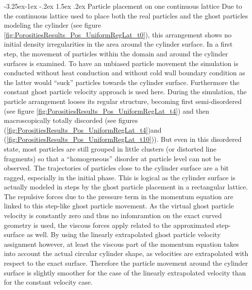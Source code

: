 \documentclass{report}
\makeatletter
\renewcommand\paragraph{\@startsection{paragraph}{4}{\z@}%
  {-3.25ex\@plus -1ex \@minus -.2ex}%
  {1.5ex \@plus .2ex}%
  {\normalfont\normalsize\bfseries}}
\makeatother
\begin{document}
\paragraph{Particle placement on one continuous lattice}
Due to the continuous lattice used to place both the real particles and the ghost particles modeling the cylinder (see figure \ref{fig:PorositiesResults_Pos_UniformRegLat_t0}), this arrangement shows no initial density irregularities in the area around the cylinder surface. 
In a first step, the movement of particles within the domain and around the cylinder surfaces is examined. To have an unbiased particle movement the simulation is conducted without heat conduction and without cold wall boundary condition as the latter would ``suck'' particles towards the cylinder surface. Furthermore the constant ghost particle velocity approach is used here. 
During the simulation, the particle arrangement looses its regular structure, becoming first semi-disordered (see figure \ref{fig:PorositiesResults_Pos_UniformRegLat_t4}) and then macroscopically totally discorded (see figures (\ref{fig:PorositiesResults_Pos_UniformRegLat_t4})and  (\ref{fig:PorositiesResults_Pos_UniformRegLat_t10})). But even in this disordered state, most particles are still grouped in little clusters (or distorted line fragments) so that a ``homogeneous'' disorder at particle level can not be observed.
The trajectories of particles close to the cylinder surface are a bit ragged, especially in the initial phase. This is logical as the cylinder surface is actually modeled in steps by the ghost particle placement in a rectangular lattice. The repulsive forces due to the pressure term in the momentum equation are linked to this step-like ghost particle movement. As the virtual ghost particle velocity is constantly zero and thus no infomramtion on the exact curved geometry is used, the viscous forces apply related to the approximated step-surface as well.
By using the linearly extrapolated ghost particle velocity assignment however, at least the viscous part of the momentum equation takes into account the actual circular cylinder shape, as velocities are extrapolated with respect to the exact surface. Therefore the particle movement around the cylinder surface is slightly smoother for the case of the linearly extrapolated velocity than for the constant velocity case. 
\end{document}
